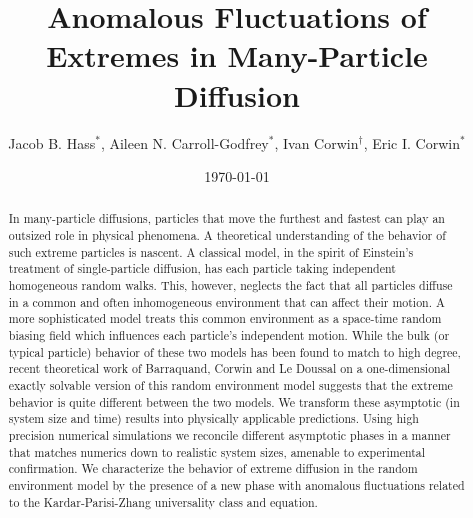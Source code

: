 \documentclass[%
 reprint,
 amsmath,amssymb,
 longbibliography,
 aps,
prl
]{revtex4-1}
\begin{document}
\title{Anomalous Fluctuations of Extremes in Many-Particle Diffusion}
\author{Jacob B. Hass$^*$, Aileen N. Carroll-Godfrey$^*$, Ivan Corwin$^\dagger$, Eric I. Corwin$^*$}
\date{\today}

\begin{abstract}
In many-particle diffusions, particles that move the furthest and fastest can play an outsized role in physical phenomena. A theoretical understanding of the behavior of such extreme particles is nascent. A classical model, in the spirit of Einstein's  treatment of single-particle diffusion, has each particle taking independent homogeneous random walks. This, however, neglects the fact that all particles diffuse in a common and often inhomogeneous environment that can affect their motion. A more sophisticated model treats this common environment as a space-time random biasing field which influences each particle's independent motion. While the bulk (or typical particle) behavior of these two models has been found to match to high degree, recent theoretical work of Barraquand, Corwin and Le Doussal on a one-dimensional exactly solvable version of this random environment model suggests that the extreme behavior is quite different between the two models. We transform these asymptotic (in system size and time) results into physically applicable predictions. Using high precision numerical simulations we reconcile different asymptotic phases in a manner that matches numerics down to realistic system sizes, amenable to experimental confirmation. We characterize the behavior of extreme diffusion in the random environment model by the presence of a new phase with anomalous fluctuations related to the Kardar-Parisi-Zhang universality class and equation.

\end{abstract}

\maketitle
\end{document}
